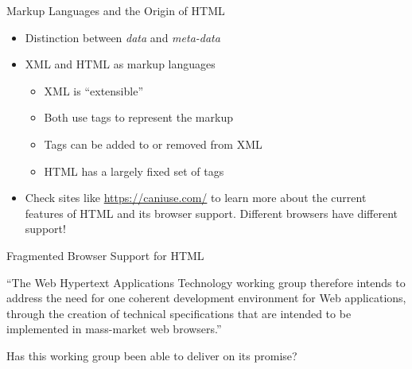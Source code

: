 \documentclass[14pt,aspectratio=169]{beamer}
\begin{document}
%
\begin{frame}{Markup Languages and the Origin of HTML}
%
  \begin{itemize}
    \item Distinction between {\em data} and {\em meta-data}
    \item XML and HTML as markup languages
      \begin{itemize}
        \item XML is ``extensible''
        \item Both use tags to represent the markup
        \item Tags can be added to or removed from XML
        \item HTML has a largely fixed set of tags
      \end{itemize}
      \vspace*{-.2in}
    \item Check sites like \url{https://caniuse.com/} to learn more about the
      current features of HTML and its browser support. Different browsers have
      different support!
  \end{itemize}
%
\end{frame}

%
\begin{frame}{Fragmented Browser Support for HTML}
  \hspace*{.25in}
  \vspace*{-.2in}
  \begin{center}
    {\large ``The Web Hypertext Applications Technology working group therefore
      intends to address the need for one coherent development environment for Web
      applications, through the creation of technical specifications that are
    intended to be implemented in mass-market web browsers.''}
  \end{center}
  \vspace{1ex}
  \begin{center}
    \small Has this working group been able to deliver on its promise?
  \end{center}
\end{frame}
\end{document}
